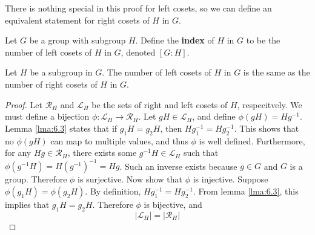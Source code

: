 \documentclass[12pt, letterpaper]{report}
\begin{document}
There is nothing special in this proof for left cosets, so we can define an equivalent statement for right cosets of \(H\) in \(G\).
\begin{definition}[Index]\label{indx}
	Let \(G\) be a group with subgroup \(H\). Define the \textbf{index} of \(H\) in \(G\) to be the number of left cosets of \(H\) in \(G\), denoted \([G:H]\).
\end{definition}
\begin{theorem}
	Let \(H\) be a subgroup in \(G\). The number of left cosets of \(H\) in \(G\) is the same as the number of right cosets of \(H\) in \(G\).
\end{theorem}
\begin{proof}
	Let \(\mathcal{R} _H\) and \(\mathcal{L} _H\) be the sets of right and left cosets of \(H\), respecitvely. We must define a bijection \(\phi :\mathcal{L} _H \to \mathcal{R} _H\). Let \(gH\in \mathcal{L}_H\), and define \(\phi (gH)=Hg^{-1} \). Lemma \ref{lma:6.3} states that if \(g_1 H = g_2 H\), then \(H g^{-1} _1 = H g^{-1} _2\). This shows that no \(\phi (gH)\) can map to multiple values, and thus \(\phi \) is well defined. Furthermore, for any \(Hg\in \mathcal{R} _H\), there exists some \(g^{-1} H\in \mathcal{L} _H\) such that \(\phi \left( g^{-1} H \right)=H (g^{-1}) ^{-1} =Hg \). Such an inverse exists because \(g\in G\) and \(G\) is a group. Therefore \(\phi \) is surjective. Now show that \(\phi \) is injective. Suppose \(\phi (g_1 H)=\phi (g_2 H)\). By definition, \(H g^{-1} _1 =H g^{-1} _2\). From lemma \ref{lma:6.3}, this implies that \(g_1 H = g_2 H\). Therefore \(\phi \) is bijective, and
	\[
		\left\vert \mathcal{L} _H \right\vert = \left\vert \mathcal{R} _H \right\vert 
	\]
\end{proof}
\end{document}
